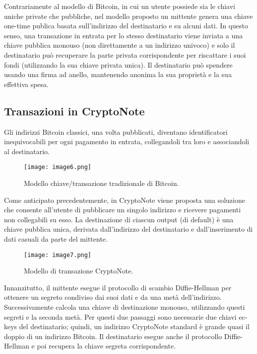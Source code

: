 Contrariamente al modello di Bitcoin, in cui un utente possiede sia le
chiavi uniche private che pubbliche, nel modello proposto un mittente
genera una chiave one-time publica basata sull'indirizzo del
destinatario e su alcuni dati. In questo senso, una transazione in
entrata per lo stesso destinatario viene inviata a una chiave pubblica
monouso (non direttamente a un indirizzo univoco) e solo il destinatario
può recuperare la parte privata corrispondente per riscattare i suoi
fondi (utilizzando la sua chiave privata unica). Il destinatario può
spendere usando una firma ad anello, mantenendo anonima la sua proprietà
e la sua effettiva spesa.


\subsection{Transazioni in CryptoNote} \label{funzionamento-delle-transazioni}
Gli indirizzi Bitcoin classici, una volta pubblicati, diventano
identificatori inequivocabili per ogni pagamento in entrata,
collegandoli tra loro e associandoli al destinatario.

\begin{figure}[h]
  \centering
  \texttt{[image: image6.png]}
  \caption{Modello chiave/transazione tradizionale di Bitcoin.}
\end{figure}

Come anticipato precedentemente, in CryptoNote viene proposta una soluzione che consente all'utente di
pubblicare un singolo indirizzo e ricevere pagamenti non collegabili su esso. 
La destinazione di ciascun output (di default) è una chiave
pubblica unica, derivata dall'indirizzo del destinatario
e dall'inserimento di dati casuali da parte del
mittente.

\begin{figure}[h]
  \centering
  \texttt{[image: image7.png]}
  \caption{Modello di transazione CryptoNote.}
\end{figure}

Innanzitutto, il mittente esegue il protocollo di scambio Diffie-Hellman
per ottenere un segreto condiviso dai suoi dati e da una metà
dell'indirizzo. Successivamente calcola una chiave di
destinazione monouso, utilizzando questi segreti e la seconda metà. Per
questi due passaggi sono necessarie due chiavi ec-keys del destinatario;
quindi, un indirizzo CryptoNote standard è grande quasi il doppio di un
indirizzo Bitcoin. Il destinatario esegue anche il protocollo
Diffie-Hellman e poi recupera la chiave segreta corrispondente.

